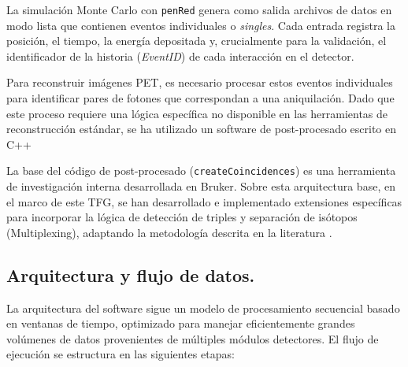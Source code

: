 La simulación Monte Carlo con \texttt{penRed} genera como salida archivos de datos en modo lista que contienen eventos individuales o \textit{singles}. Cada entrada registra la posición, el tiempo, la energía depositada y, crucialmente para la validación, el identificador de la historia (\textit{EventID}) de cada interacción en el detector.

Para reconstruir imágenes PET, es necesario procesar estos eventos individuales para identificar pares de fotones que correspondan a una aniquilación. Dado que este proceso requiere una lógica específica no disponible en las herramientas de reconstrucción estándar, se ha utilizado un software de post-procesado escrito en C++

La base del código de post-procesado (\texttt{createCoincidences}) es una herramienta de investigación interna desarrollada en Bruker. Sobre esta arquitectura base, en el marco de este TFG, se han desarrollado e implementado extensiones específicas para incorporar la lógica de detección de triples y separación de isótopos (Multiplexing), adaptando la metodología descrita en la literatura \parencite{Andreyev2011}.

\subsection{Arquitectura y flujo de datos.}

La arquitectura del software sigue un modelo de procesamiento secuencial basado en ventanas de tiempo, optimizado para manejar eficientemente grandes volúmenes de datos provenientes de múltiples módulos detectores. El flujo de ejecución se estructura en las siguientes etapas:

